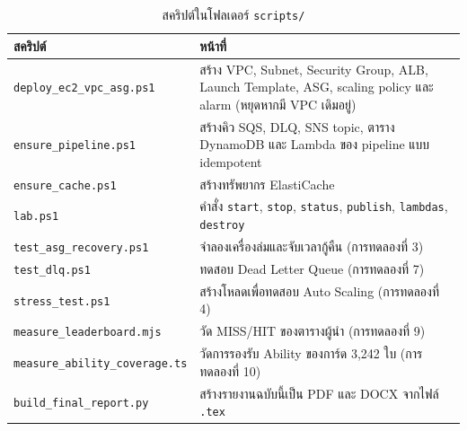 \begin{table}[H]
\centering
\caption{สคริปต์ในโฟลเดอร์ \texttt{scripts/}}
\small
\begin{tabularx}{\textwidth}{lX}
\toprule
\textbf{สคริปต์} & \textbf{หน้าที่} \\
\midrule
\texttt{deploy\_ec2\_vpc\_asg.ps1} & สร้าง VPC, Subnet, Security Group, ALB, Launch Template, ASG, scaling policy และ alarm (หยุดหากมี VPC เดิมอยู่) \\
\texttt{ensure\_pipeline.ps1} & สร้างคิว SQS, DLQ, SNS topic, ตาราง DynamoDB และ Lambda ของ pipeline แบบ idempotent \\
\texttt{ensure\_cache.ps1} & สร้างทรัพยากร ElastiCache \\
\texttt{lab.ps1} & คำสั่ง \texttt{start}, \texttt{stop}, \texttt{status}, \texttt{publish}, \texttt{lambdas}, \texttt{destroy} \\
\texttt{test\_asg\_recovery.ps1} & จำลองเครื่องล่มและจับเวลากู้คืน (การทดลองที่ 3) \\
\texttt{test\_dlq.ps1} & ทดสอบ Dead Letter Queue (การทดลองที่ 7) \\
\texttt{stress\_test.ps1} & สร้างโหลดเพื่อทดสอบ Auto Scaling (การทดลองที่ 4) \\
\texttt{measure\_leaderboard.mjs} & วัด MISS/HIT ของตารางผู้นำ (การทดลองที่ 9) \\
\texttt{measure\_ability\_coverage.ts} & วัดการรองรับ Ability ของการ์ด 3,242 ใบ (การทดลองที่ 10) \\
\texttt{build\_final\_report.py} & สร้างรายงานฉบับนี้เป็น PDF และ DOCX จากไฟล์ \texttt{.tex} \\
\bottomrule
\end{tabularx}
\end{table}
